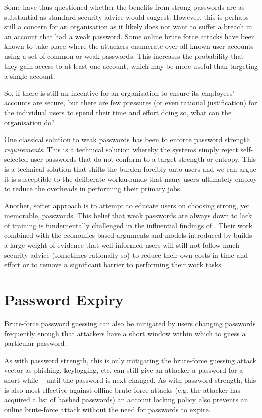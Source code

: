 \documentclass{report}
\begin{document}
Some have thus questioned whether the benefits from strong
passwords are as substantial as standard security advice
would suggest. However, this is perhaps still a concern
for an organisation as it likely does not want to suffer
a breach in an account that had a weak password. Some
online brute force attacks have been known to take place
where the attackers enumerate over all known user accounts
using a set of common or weak passwords. This increases
the probability that they gain access to at least one
account, which may be more useful than targeting a single
account.

So, if there is still an incentive for an organisation
to ensure its employees' accounts are secure, but there
are few pressures (or even rational justification)
for the individual users to spend their time and effort doing
so, what can the organisation do?

One classical solution to weak passwords
has been to enforce password strength \emph{requirements}.
This is a technical solution whereby the systems simply
reject self-selected user passwords that do not conform
to a target strength or entropy.
This is a technical solution that shifts the burden forcibly onto
users and we can argue it is susceptible to the deliberate workarounds
that many users ultimately employ to reduce the overheads
in performing their primary jobs.

Another, softer approach is to attempt to educate users
on choosing strong, yet memorable, passwords. This belief
that weak passwords are always down to lack of training
is fundementally challenged in the influential findings
of \cite{adams1999users}. Their work combined with the
economics-based arguments and models introduced by %
builds a large weight of evidence that well-informed
users will still not follow much security advice
(sometimes rationally so) to reduce their own costs in
time and effort or to remove a significant barrier
to performing their work tasks.

\section{Password Expiry}

Brute-force password guessing can also be mitigated by
users changing passwords frequently enough that attackers
have a short window within which to guess a particular
password.

As with password strength, this is only mitigating the
brute-force guessing attack vector as phishing, keylogging, etc.
can still give an attacker a password for a short while -- until
the password is next changed. As with password strength, this
is also most effective against offline brute-force attacks (e.g.
the attacker has acquired a list of hashed passwords) an
account locking policy also prevents an online brute-force
attack without the need for passwords to expire.
\end{document}
